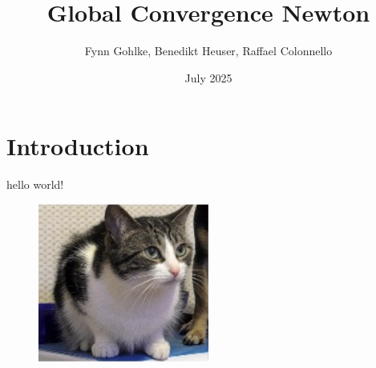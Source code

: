 \documentclass{article}
\title{Global Convergence Newton}
\author{Fynn Gohlke, Benedikt Heuser, Raffael Colonnello}
\date{July 2025}
\begin{document}
\maketitle

\section{Introduction}

hello world!
\begin{figure}
  \begin{center}
    \includegraphics[width=0.5\textwidth]{figures/cat.png}
  \end{center}
  \caption{}\label{fig:}
\end{figure}
\end{document}
